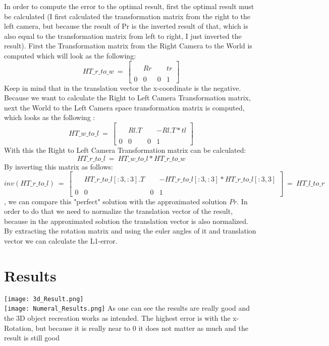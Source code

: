 \documentclass{report}
\begin{document}
		In order to compute the error to the optimal result, first the optimal result must be calculated (I first calculated the transformation matrix from the right to the left camera, but because the result of Pr is the inverted result of that, which is also equal to the transformation matrix from left to right, I just inverted the result). First the Transformation matrix from the Right Camera to the World is computed which will look as the following:
		\[
			HT\_r\_to\_w \ = \  
			\begin{bmatrix}
				\ & \ & \ & \ \\
				\ & Rr & \ & tr \\
				\ & \ & \ & \ \\
				0 & 0 & 0 & 1
			\end{bmatrix}
		\]
		Keep in mind that in the translation vector the x-coordinate is the negative. \\
		Because we want to calculate the Right to Left Camera Transformation matrix, next the World to the Left Camera space transformation matrix is computed, which looks as the following : 
		\[
			HT\_w\_to\_l \ = \  
			\begin{bmatrix}
				\ & \ & \ & \ \\
				\ & Rl.T & \ & -Rl.T * tl \\
				\ & \ & \ & \ \\
				0 & 0 & 0 & 1
			\end{bmatrix}
		\]
		With this the Right to Left Camera Transformation matrix can be calculated:
		\[
			HT\_r\_to\_l \ = \ HT\_w\_to\_l * HT\_r\_to\_w
		\]
		By inverting this matrix as follows:
		\[
			inv(HT\_r\_to\_l) \ = \ 
			\begin{bmatrix}
				\ & \ & \ & \ \\
				\ & HT\_r\_to\_l[:3,:3].T & \ & -HT\_r\_to\_l[:3,:3] * HT\_r\_to\_l[:3,3] \\
				\ & \ & \ & \ \\
				0 & 0 & 0 & 1
			\end{bmatrix}
			\ = \ HT\_l\_to\_r
		\]
		, we can compare this "perfect" solution with the approximated solution $Pr$. In order to do that we need to normalize the translation vector of the result, because in the approximated solution the translation vector is also normalized. By extracting the rotation matrix and using the euler angles of it and translation vector we can calculate the L1-error.
	\closesection
	
	\section{Results}
	\texttt{[image: 3d\_Result.png]} \\
	\texttt{[image: Numeral\_Results.png]}
	\startsection
		As one can see the results are really good and the 3D object recreation works as intended. The highest error is with the x-Rotation, but because it is really near to 0 it does not matter as much and the result is still good
	\closesection
\end{document}
